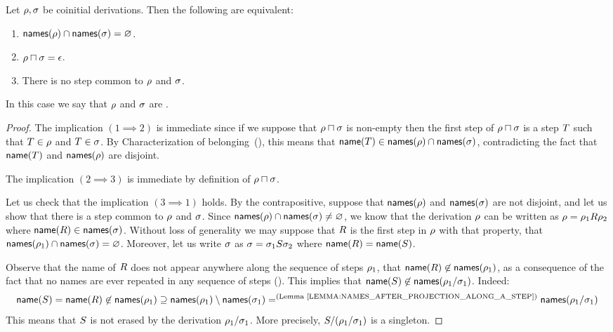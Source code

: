 \begin{lemma}
Let $\rho,\sigma$ be coinitial derivations.
Then the following are equivalent:
\begin{enumerate}
\item $\mathsf{names}(\rho) \cap \mathsf{names}(\sigma) = \varnothing$.
\item $\rho \sqcap \sigma = \epsilon$.
\item There is no step common to $\rho$ and $\sigma$.
\end{enumerate}
In this case we say that $\rho$ and $\sigma$ are .
\end{lemma}
\begin{proof}
The implication $(1 \implies 2)$ is immediate since if we suppose that $\rho \sqcap \sigma$ is non-empty
then the first step of $\rho \sqcap \sigma$ is a step $T$
such that $T \in \rho$ and $T \in \sigma$.
By Characterization of belonging~(),
this means that $\mathsf{name}(T) \in \mathsf{names}(\rho) \cap \mathsf{names}(\sigma)$,
contradicting the fact that $\mathsf{name}(T)$ and $\mathsf{names}(\rho)$ are disjoint.

The implication
$(2 \implies 3)$ is immediate by definition of $\rho \sqcap \sigma$.

Let us check that the implication $(3 \implies 1)$ holds.
By the contrapositive, suppose that $\mathsf{names}(\rho)$ and $\mathsf{names}(\sigma)$
are not disjoint, and let us show that there is a step common to $\rho$ and $\sigma$.
Since $\mathsf{names}(\rho) \cap \mathsf{names}(\sigma) \neq \varnothing$,
we know that the derivation $\rho$ can be written as $\rho = \rho_1 R \rho_2$
where $\mathsf{name}(R) \in \mathsf{names}(\sigma)$.
Without loss of generality we may suppose
that $R$ is the first step in $\rho$ with that property,
\ie that $\mathsf{names}(\rho_1) \cap \mathsf{names}(\sigma) = \varnothing$.
Moreover, let us write $\sigma$ as $\sigma = \sigma_1 S \sigma_2$ 
where $\mathsf{name}(R) = \mathsf{name}(S)$.

Observe that the name of $R$ does not appear anywhere along the sequence of steps $\rho_1$,
\ie that $\mathsf{name}(R) \not\in \mathsf{names}(\rho_1)$, as a consequence of the
fact that no names are ever repeated in any sequence of steps ().
This implies that $\mathsf{name}(S) \not\in \mathsf{names}(\rho_1/\sigma_1)$.
Indeed:
\[
  \name(\redextwo)
  = \name(\redex)
  \not\in \names(\redseq_1)
  \supseteq \names(\redseq_1) \setminus \names(\redseqtwo_1)
  =^{(\text{\rlem{names_after_projection_along_a_step}})} \names(\redseq_1/\redseqtwo_1)
\]
This means that $S$ is not erased by the derivation $\rho_1/\sigma_1$.
More precisely, $S/(\rho_1/\sigma_1)$ is a singleton.


\end{proof}
